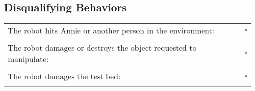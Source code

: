 \subsection*{Disqualifying Behaviors}
\begin{tabular}{ l c}
The robot hits Annie or another person in the environment: & $\square$ \\ \\
The robot damages or destroys the object requested to manipulate: & $\square$ \\ \\
The robot damages the test bed: & $\square$ \\ \\
\end{tabular}


